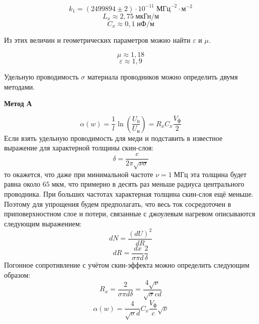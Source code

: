 \begin{figure}[ht!]
\end{figure}
\[
    k_{1} = \left(2499894 \pm 2\right)\cdot 10^{-11}\;\text{МГц}^{-2}\cdot\text{м}^{-2}
\]
\[
    L_{x} \approx 2{,}75\;\text{мкГн}/\text{м}
\]
\[
    C_{x} \approx 0{,}1\;\text{нФ}/\text{м}
\]


Из этих величин и геометрических параметров можно найти $ \varepsilon$ и $ \mu$.

\[
    \mu \approx 1{,}18
\]
\[
    \varepsilon \approx 1{,}9
\]


Удельную проводимость $ \sigma$ материала проводников можно определить двумя методами.

\textbf{Метод А}

\[
    \alpha(w) = \frac{1}{l}\ln\left(\frac{U_{0}}{U_{\text{н}}}\right) = R_{x}C_{x}\frac{V_{\text{ф}}}{2}    
\]
Если взять удельную проводимость для меди и подставить в известное выражение для характерной толщины скин-слоя:
\[
    \delta = \frac{c}{2 \pi \sqrt{\nu\sigma}}
\]
то окажется, что даже при минимальной частоте $\nu=1\;\text{МГц}$  эта толщина будет равна около
$65\;\text{мкм}$, что примерно в десять раз меньше радиуса центрального проводника.
 При больших частотах характерная толщина скин-слоя ещё меньше. Поэтому для упрощения будем предполагать, что весь ток сосредоточен в приповерхностном слое и потери, связанные с джоулевым нагревом описываются следующим выражением:
 \[
     dN=\frac{(dU)^{2}}{dR}
 \]
 \[
     dR=\frac{dx}{\sigma \pi d}\frac{2}{ \delta}
 \]
 Погонное сопротивление с учётом скин-эффекта можно определить следующим образом:
 \[
     R_{x} = \frac{2}{\sigma \pi d \delta} = \frac{4\sqrt{\nu}}{\sqrt{\sigma}cd}    
 \]
\[
    \alpha(w) = \frac{4}{\sqrt{\sigma}d}C_{x}\frac{V_{\text{ф}}}{c}\sqrt{\nu}
\]

